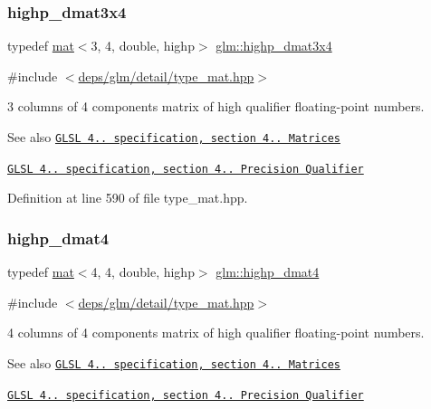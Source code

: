 \subsubsection{\texorpdfstring{highp\+\_\+dmat3x4}{highp\_dmat3x4}}
{\footnotesize\ttfamily typedef \hyperlink{structglm_1_1mat}{mat}$<$3, 4, double, highp$>$ \hyperlink{group__core__precision_ga21d3883c59ff3949404de6713e86c89e}{glm\+::highp\+\_\+dmat3x4}}



{\ttfamily \#include $<$\hyperlink{type__mat_8hpp}{deps/glm/detail/type\+\_\+mat.\+hpp}$>$}

3 columns of 4 components matrix of high qualifier floating-\/point numbers.

\begin{DoxySeeAlso}{See also}
\href{http://www.opengl.org/registry/doc/GLSLangSpec.4.20.8.pdf}{\tt G\+L\+SL 4.. specification, section 4.. Matrices} 

\href{http://www.opengl.org/registry/doc/GLSLangSpec.4.20.8.pdf}{\tt G\+L\+SL 4.. specification, section 4.. Precision Qualifier} 
\end{DoxySeeAlso}


Definition at line 590 of file type\+\_\+mat.\+hpp.

\mbox{\label{group__core__precision_ga878bb8f4881dbf688ab9bbb5e2944a54}} 
\subsubsection{\texorpdfstring{highp\+\_\+dmat4}{highp\_dmat4}}
{\footnotesize\ttfamily typedef \hyperlink{structglm_1_1mat}{mat}$<$4, 4, double, highp$>$ \hyperlink{group__core__precision_ga878bb8f4881dbf688ab9bbb5e2944a54}{glm\+::highp\+\_\+dmat4}}



{\ttfamily \#include $<$\hyperlink{type__mat_8hpp}{deps/glm/detail/type\+\_\+mat.\+hpp}$>$}

4 columns of 4 components matrix of high qualifier floating-\/point numbers.

\begin{DoxySeeAlso}{See also}
\href{http://www.opengl.org/registry/doc/GLSLangSpec.4.20.8.pdf}{\tt G\+L\+SL 4.. specification, section 4.. Matrices} 

\href{http://www.opengl.org/registry/doc/GLSLangSpec.4.20.8.pdf}{\tt G\+L\+SL 4.. specification, section 4.. Precision Qualifier} 
\end{DoxySeeAlso}


